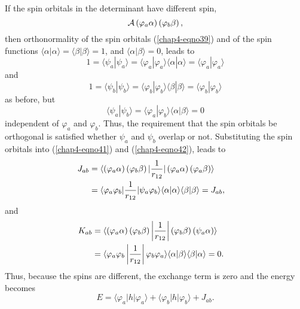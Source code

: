 {If the spin orbitals in the determinant have different spin,
\begin{equation}
{\cal A} \left( \varphi_a \alpha \right) \left( \varphi_b \beta \right) ,
\end{equation}
then orthonormality of the spin orbitals (\ref{chap4-eqno39}) and of
the spin functions $\langle \alpha | \alpha \rangle = \langle \beta |
\beta \rangle = 1$, and $\langle \alpha | \beta \rangle = 0$, leads to
\begin{equation}
1 = \langle \psi_a | \psi_a \rangle = \langle \varphi_a | \varphi_a \rangle 
\langle \alpha | \alpha \rangle = \langle \varphi_a | \varphi_a \rangle
\end{equation}
and
\begin{equation}
1 = \langle \psi_b | \psi_b \rangle = \langle \varphi_b | \varphi_b \rangle 
\langle \beta | \beta \rangle = \langle \varphi_b | \varphi_b \rangle
\end{equation}
as before, but
\begin{equation}
\langle \psi_a | \psi_b \rangle = \langle \varphi_a | \varphi_b \rangle \langle 
\alpha | \beta \rangle = 0
\end{equation}
independent of $\varphi_a$ and $\varphi_b$. Thus, the requirement that the spin 
orbitals be orthogonal is satisfied whether $\psi_a$ and $\psi_b$ overlap 
or not.  Substituting the spin orbitals into (\ref{chap4-eqno41}) and (\ref{chap4-eqno42}), leads to
\begin{eqnarray}
J_{ab} & = \langle \left( \varphi_a \alpha \right) \left( \varphi_b \beta \right) 
| {1 \over r_{12}} | \left( \varphi_a \alpha \right) \left( \varphi_a 
\beta \right) \rangle\cr
& = \langle \varphi_a \varphi_b | {1 \over r_{12}} | \psi_a \varphi_b 
\rangle \langle \alpha | \alpha \rangle \langle \beta | \beta \rangle = 
J_{ab},\cr
\end{eqnarray}
and
\begin{eqnarray}
K_{ab} &= \langle \left( \varphi_a \alpha \right) \left( \varphi_b \beta \right) 
\left| {1 \over r_{12}} \right| \left( \varphi_b \beta \right) \left( \psi_a 
\alpha \right) \rangle\cr
&= \langle \varphi_a \varphi_b \left| {1 \over r_{12}} \right| \varphi_b \varphi_a 
\rangle \langle \alpha | \beta \rangle \langle \beta | \alpha \rangle = 
0.\cr
\end{eqnarray}
Thus, because the spins are different, the exchange term is zero and the
energy becomes
\begin{equation}
E = \langle \varphi_a | h | \varphi_a \rangle + \langle \varphi_b | h | \varphi_b 
\rangle + J_{ab}.
\end{equation}

}
